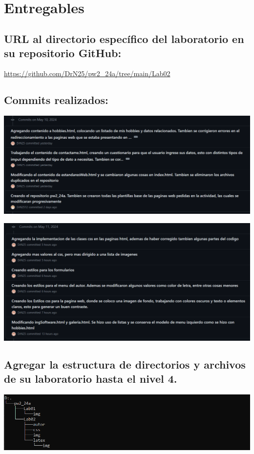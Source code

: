 \documentclass{article}
\begin{document}
\section{Entregables}

\subsection{URL al directorio específico del laboratorio en su repositorio GitHub:}
\url{https://github.com/DrN25/pw2_24a/tree/main/Lab02}

\subsection{Commits realizados:}



\includegraphics[width=\textwidth]{img/1.png}



\includegraphics[width=\textwidth]{img/2.png}



\subsection{Agregar la estructura de directorios y archivos de su laboratorio hasta el nivel 4.}



\includegraphics[width=\textwidth]{img/3.png}
\end{document}
